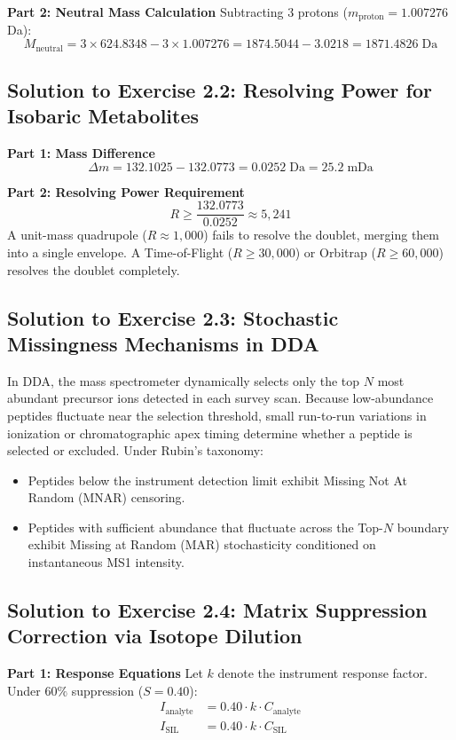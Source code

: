 \documentclass[11pt,twoside,openright]{book}
\begin{document}
\noindent\textbf{Part 2: Neutral Mass Calculation}\enspace
Subtracting 3 protons ($m_{\text{proton}} = 1.007276$ Da):
\begin{equation}
M_{\text{neutral}} = 3 \times 624.8348 - 3 \times 1.007276 = 1874.5044 - 3.0218 = 1871.4826\;\text{Da}
\end{equation}

\subsection{Solution to Exercise 2.2: Resolving Power for Isobaric Metabolites}
\noindent\textbf{Part 1: Mass Difference}\enspace
\begin{equation}
\Delta m = 132.1025 - 132.0773 = 0.0252\;\text{Da} = 25.2\;\text{mDa}
\end{equation}

\noindent\textbf{Part 2: Resolving Power Requirement}\enspace
\begin{equation}
R \ge \frac{132.0773}{0.0252} \approx 5,241
\end{equation}
A unit-mass quadrupole ($R \approx 1,000$) fails to resolve the doublet, merging them into a single envelope. A Time-of-Flight ($R \ge 30,000$) or Orbitrap ($R \ge 60,000$) resolves the doublet completely.

\subsection{Solution to Exercise 2.3: Stochastic Missingness Mechanisms in DDA}
In DDA, the mass spectrometer dynamically selects only the top $N$ most abundant precursor ions detected in each survey scan. Because low-abundance peptides fluctuate near the selection threshold, small run-to-run variations in ionization or chromatographic apex timing determine whether a peptide is selected or excluded. Under Rubin's taxonomy:
\begin{itemize}
    \item Peptides below the instrument detection limit exhibit Missing Not At Random (MNAR) censoring.
    \item Peptides with sufficient abundance that fluctuate across the Top-$N$ boundary exhibit Missing at Random (MAR) stochasticity conditioned on instantaneous MS1 intensity.
\end{itemize}

\subsection{Solution to Exercise 2.4: Matrix Suppression Correction via Isotope Dilution}
\noindent\textbf{Part 1: Response Equations}\enspace
Let $k$ denote the instrument response factor. Under $60\%$ suppression ($S = 0.40$):
\begin{align}
I_{\text{analyte}} &= 0.40 \cdot k \cdot C_{\text{analyte}} \\
I_{\text{SIL}}     &= 0.40 \cdot k \cdot C_{\text{SIL}}
\end{align}
\end{document}
